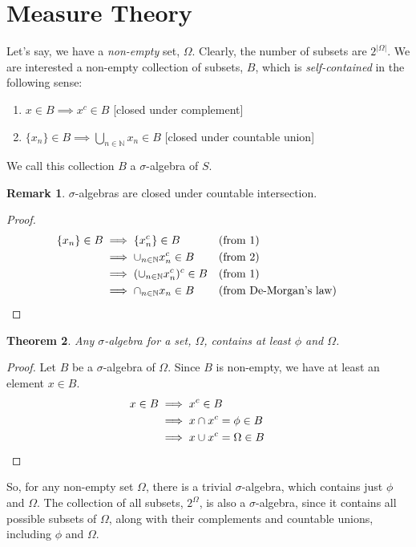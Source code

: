 \documentclass{report}
\theoremstyle{plain}
\newtheorem{theorem}{Theorem}[chapter] %
\theoremstyle{definition}
\newtheorem{remark}[theorem]{Remark} %
\begin{document}
\section{Measure Theory}
Let's say, we have a \emph{non-empty} set, $\Omega$. Clearly, the number of subsets are $2^{|\Omega|}$. We are interested a non-empty collection of subsets, $B$, which is \emph{self-contained} in the following sense:
\begin{enumerate}
\item $x\in B\implies x^c\in B$ [closed under complement]
\item $\{x_n\}\in B\implies \bigcup_{n\in\mathbb{N}} x_n \in B$ [closed under countable union]
\end{enumerate}
\noindent We call this collection $B$ a $\sigma$-algebra of $S$.
\begin{remark}
$\sigma$-algebras are closed under countable intersection.
\end{remark}
\begin{proof}
\begin{align}
\{x_n\}\in B
&\implies \{x_n^c\}\in B &&\text{(from 1)} \\
&\implies \cup_{n\in\mathbb{N}} x_n^c \in B &&\text{(from 2)}\\
&\implies (\cup_{n\in\mathbb{N}} x_n^c )^c\in B &&\text{(from 1)} \\
&\implies \cap_{n\in\mathbb{N}} x_n \in B &&\text{(from De-Morgan's law)}&&\qedhere
\end{align}
\end{proof}
\begin{theorem}
Any $\sigma$-algebra for a set, $\Omega$, contains at least $\phi$ and $\Omega$.
\end{theorem}
\begin{proof}
Let $B$ be a $\sigma$-algebra of $\Omega$. Since $B$ is non-empty, we have at least an element $x\in B$.
\begin{align}
x\in B
&\implies x^c\in B \\
&\implies x\cap x^c=\phi\in B \\
&\implies x\cup x^c=\Omega\in B &&\qedhere
\end{align}
\end{proof}
\noindent So, for any non-empty set $\Omega$, there is a trivial $\sigma$-algebra, which contains just $\phi$ and $\Omega$. The collection of all subsets, $2^\Omega$, is also a $\sigma$-algebra, since it contains all possible subsets of $\Omega$, along with their complements and countable unions, including $\phi$ and $\Omega$.
\end{document}
